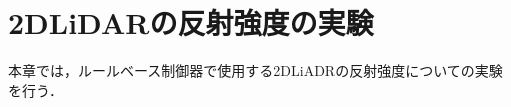 \chapter{2DLiDARの反射強度の実験}

  本章では，ルールベース制御器で使用する2DLiADRの反射強度についての実験を行う．

\label{chap:experiments_intensities}
%






%
